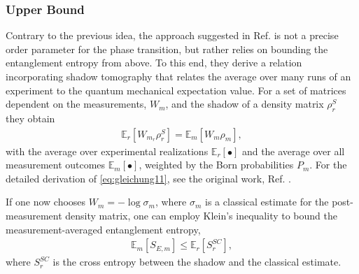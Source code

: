 \subsubsection{Upper Bound}

Contrary to the previous idea, the approach suggested in Ref.
\cite{garrattProbingPostmeasurementEntanglement2023} is not a precise order
parameter for the phase transition, but rather relies on bounding the
entanglement entropy from above. To this end, they derive a relation
incorporating shadow tomography that relates the average over many runs of an
experiment to the quantum mechanical expectation value. 
For a set of matrices dependent
on the measurements, $W_m$, and the shadow of a density matrix $\rho^S_r$ they
obtain
\begin{align}\label{eq:gleichung11}
  \mathbb{E}_r[W_{m_r} \rho^S_r] = \mathbb{E}_m[W_m \rho_m]
,\end{align}
with the average over experimental realizations $\mathbb{E}_r[\bullet]$ and the
average over all measurement outcomes $\mathbb{E}_m[\bullet]$, weighted by the
Born probabilities $P_m$. For the detailed derivation of \cref{eq:gleichung11},
see the original work, Ref.
\cite{garrattProbingPostmeasurementEntanglement2023}.

If one now chooses $W_m = -\log \sigma_m$, where $\sigma_m$ is a classical
estimate for the post-measurement density matrix, one can employ Klein's
inequality to bound the measurement-averaged entanglement entropy,
\begin{align}
  \mathbb{E}_m[S_{E,m}] \leq \mathbb{E}_r[S_r^{SC}]
,\end{align}
where $S_r^{SC}$ is the cross entropy between the shadow and the classical
estimate.

%
%
%
%
%
%

